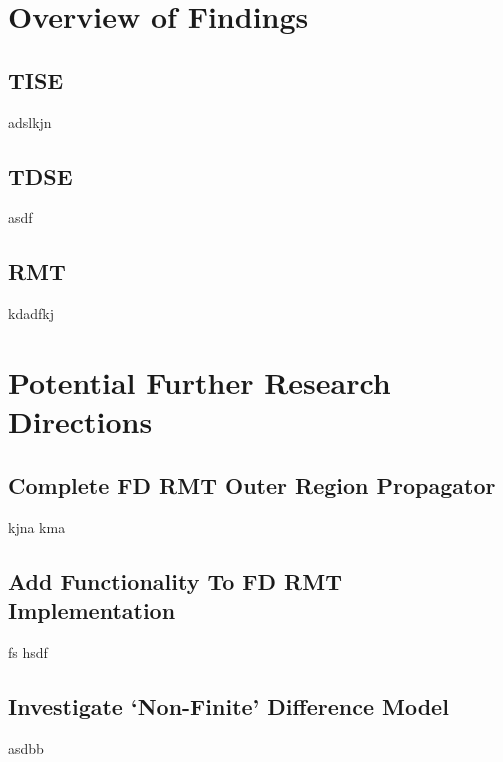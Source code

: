 \section{Overview of Findings}
\subsection{TISE}
adslkjn 
\subsection{TDSE}
asdf 
\subsection{RMT}
kdadfkj

\section{Potential Further Research Directions}

\subsection{Complete FD RMT Outer Region Propagator}
kjna kma

\subsection{Add Functionality To FD RMT Implementation}
fs hsdf 

\subsection{Investigate `Non-Finite' Difference Model}
asdbb

